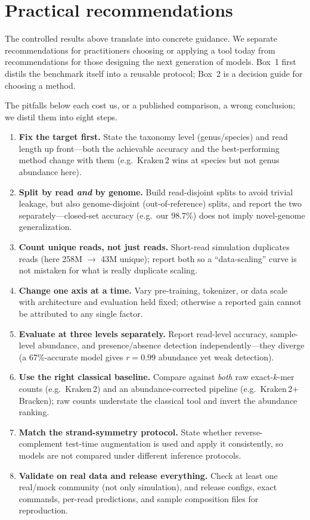 \section{Practical recommendations}
\label{sec:recommendations}

The controlled results above translate into concrete guidance. We separate
recommendations for practitioners choosing or applying a tool today from
recommendations for those designing the next generation of models. Box~1 first
distils the benchmark itself into a reusable protocol; Box~2 is a decision guide
for choosing a method.

\begin{boxtext}
The pitfalls below each cost us, or a published comparison, a wrong conclusion;
we distil them into eight steps.
\begin{enumerate}[1.]\setlength{\itemsep}{2pt}
\item \textbf{Fix the target first.} State the taxonomy level (genus/species) and
read length up front---both the achievable accuracy and the best-performing method
change with them (e.g.\ Kraken\,2 wins at species but not genus abundance here).
\item \textbf{Split by read \emph{and} by genome.} Build read-disjoint splits to
avoid trivial leakage, but also genome-disjoint (out-of-reference) splits, and
report the two separately---closed-set accuracy (e.g.\ our 98.7\%) does not imply
novel-genome generalization.
\item \textbf{Count unique reads, not just reads.} Short-read simulation
duplicates reads (here 258M $\to$ 43M unique); report both so a ``data-scaling''
curve is not mistaken for what is really duplicate scaling.
\item \textbf{Change one axis at a time.} Vary pre-training, tokenizer, or data
scale with architecture and evaluation held fixed; otherwise a reported gain
cannot be attributed to any single factor.
\item \textbf{Evaluate at three levels separately.} Report read-level accuracy,
sample-level abundance, and presence/absence detection independently---they
diverge (a 67\%-accurate model gives $r=0.99$ abundance yet weak detection).
\item \textbf{Use the right classical baseline.} Compare against \emph{both} raw
exact-$k$-mer counts (e.g.\ Kraken\,2) and an abundance-corrected pipeline (e.g.\
Kraken\,2$+$Bracken); raw counts understate the classical tool and invert the
abundance ranking.
\item \textbf{Match the strand-symmetry protocol.} State whether reverse-complement
test-time augmentation is used and apply it consistently, so models are not
compared under different inference protocols.
\item \textbf{Validate on real data and release everything.} Check at least one
real/mock community (not only simulation), and release configs, exact commands,
per-read predictions, and sample composition files for reproduction.
\end{enumerate}
\end{boxtext}

